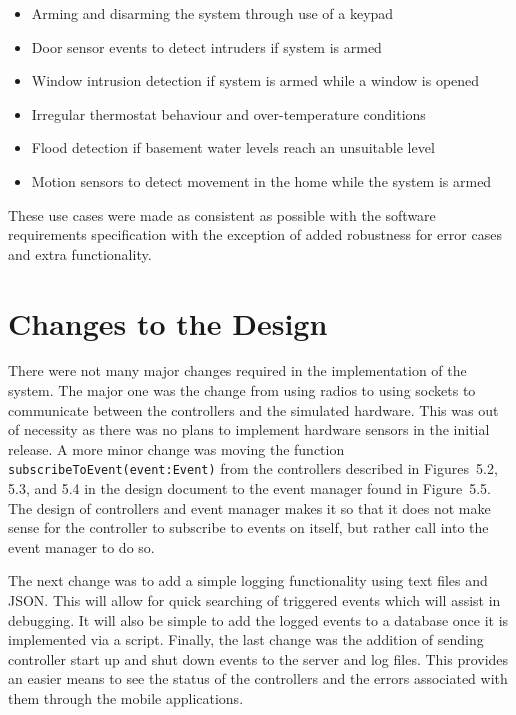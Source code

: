 \documentclass{article}
\begin{document}
\begin{itemize}
\item Arming and disarming the system through use of a keypad
\item Door sensor events to detect intruders if system is armed
\item Window intrusion detection if system is armed while a window is opened
\item Irregular thermostat behaviour and over-temperature conditions
\item Flood detection if basement water levels reach an unsuitable level
\item Motion sensors to detect movement in the home while the system is armed
\end{itemize}

These use cases were made as consistent as possible with the software requirements
specification with the exception of added robustness for error cases and extra
functionality.

\section{Changes to the Design} %


There were not many major changes required in the implementation of the system.
The major one was the change from using radios to using sockets to communicate
between the controllers and the simulated hardware. This was out of necessity
as there was no plans to implement hardware sensors in the initial release. A
more minor change was moving the function
\texttt{subscribeToEvent(event:Event)} from the controllers described in
Figures~5.2, 5.3, and 5.4 in the design document to the event manager found in
Figure~5.5. The design of controllers and event manager makes it so that it
does not make sense for the controller to subscribe to events on itself, but
rather call into the event manager to do so.

The next change was to add a simple logging functionality using text files and
JSON. This will allow for quick searching of triggered events which will assist
in debugging. It will also be simple to add the logged events to a database
once it is implemented via a script. Finally, the last change was the addition
of sending controller start up and shut down events to the server and log
files. This provides an easier means to see the status of the controllers and
the errors associated with them through the mobile applications.
\end{document}
